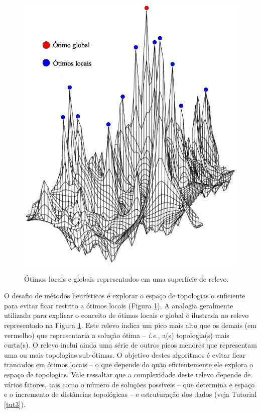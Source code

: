 \begin{refsection}
  \begin{figure}[H]
       \centering
      {\includegraphics[scale=0.70]{figures/tut4/landscape.eps}}
      {\caption[\textit{\textit{Ótimos locais e globais} }]{Ótimos locais e globais representados em uma superfície de relevo.}\label{tut4:fig:landscape}}
  \end{figure}




O desafio de métodos heurísticos é explorar o espaço de topologias o suficiente para evitar ficar restrito a ótimos locais (Figura \ref{tut4:fig:landscape}). A analogia geralmente utilizada para explicar o conceito de ótimos locais e global é ilustrada no relevo representado na Figura \ref{tut4:fig:landscape}. Este relevo indica um pico mais alto que os demais (em vermelho) que representaria a solução ótima -- \textit{i.e.}, a(s) topologia(s) mais curta(s). O relevo inclui ainda uma série de outros picos menores que representam uma ou mais topologias sub-ótimas. O objetivo destes algoritmos é evitar ficar trancados em ótimos locais -- o que depende do quão eficientemente ele explora o espaço de topologias. Vale ressaltar que a complexidade deste relevo depende de vários fatores, tais como o número de soluções possíveis -- que determina e espaço e o incremento de distâncias topológicas -- e estruturação dos dados (veja Tutorial \ref{tut3}).


\end{refsection}
